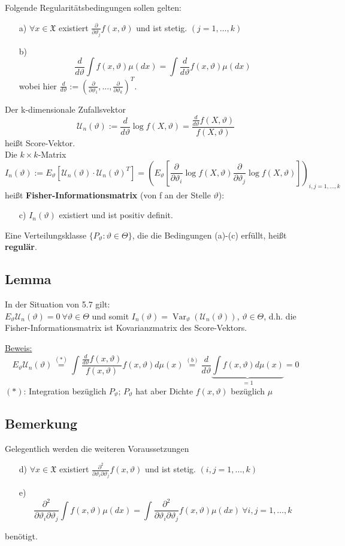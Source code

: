 \documentclass[a4paper,11pt,twoside,titlepage]{article}
\newcommand{\XX}{{\mathfrak X}} %
\newcommand\UU{ \mathcal{U} } %
\DeclareMathOperator{\var}{Var}
\begin{document}
Folgende Regularitätsbedingungen sollen gelten:
\begin{itemize}
\item[a)] $\forall x\in\XX$ existiert $\frac{\partial}{\partial\vartheta_j}f(x,\vartheta)$ und ist stetig. $(j=1,\ldots,k)$
\item[b)] \[\frac{d}{d\vartheta}\int f(x,\vartheta)\mu(dx)=\int\frac{d}{d\vartheta}f(x,\vartheta)\mu(dx)\]
wobei hier $\frac{d}{d\vartheta}:=(\frac{\partial}{\partial\vartheta_1},\ldots,\frac{\partial}{\partial\vartheta_k})^T$.
\end{itemize}

Der k-dimensionale Zufallsvektor
\[\UU_n(\vartheta):=\frac{d}{d\vartheta}\log f(X,\vartheta)=\frac{\frac{d}{d\vartheta}f(X,\vartheta)}{f(X,\vartheta)}\]
heißt Score-Vektor.\\
Die $k\times k$-Matrix
\[I_n(\vartheta):=E_\vartheta[\UU_n(\vartheta)\cdot \UU_n(\vartheta)^T]=\left(E_\vartheta\left[\frac{\partial}{\partial\vartheta_i}\log f(X,\vartheta)\frac{\partial}{\partial\vartheta_j}\log f(X,\vartheta)\right]\right)_{i,j=1,\ldots,k}\]
heißt \textbf{Fisher-Informationsmatrix} (von f an der Stelle $\vartheta$):
\begin{itemize}
\item[c)] $I_n(\vartheta)$ existiert und ist positiv definit.
\end{itemize}

Eine Verteilungsklasse $\{P_\vartheta:\vartheta\in\Theta\}$, die die Bedingungen (a)-(c) erfüllt, heißt \textbf{regulär}.

\subsection{Lemma}
In der Situation von 5.7 gilt:\\
$E_\vartheta \UU_n(\vartheta)=0\ \forall\vartheta\in\Theta$ und somit $I_n(\vartheta)=\var_\vartheta(\UU_n(\vartheta))$, $\vartheta\in\Theta$, d.h. die Fisher-Informationsmatrix ist Kovarianzmatrix des Score-Vektors.

\underline{Beweis:}
\[E_\vartheta\UU_n(\vartheta)\stackrel{(\ast)}{=}\int\frac{\frac{d}{d\vartheta}f(x,\vartheta)}{f(x,\vartheta)}f(x,\vartheta)d\mu(x)\stackrel{(b)}{=}\frac{d}{d\vartheta}\underbrace{\int f(x,\vartheta)d\mu(x)}_{=1}=0\]
$(\ast)$: Integration bezüglich $P_\vartheta$; $P_\vartheta$ hat aber Dichte $f(x,\vartheta)$ bezüglich $\mu$

\subsection{Bemerkung} 
Gelegentlich werden die weiteren Voraussetzungen 
\begin{itemize}
\item[d)] $\forall x\in\XX$ existiert $\frac{\partial^2}{\partial\vartheta_i\partial\vartheta_j}f(x,\vartheta)$ und ist stetig. $(i,j=1,\ldots,k)$
\item[e)] \[\frac{\partial^2}{\partial\vartheta_i\partial\vartheta_j}\int f(x,\vartheta)\mu(dx)=\int\frac{\partial^2}{\partial\vartheta_i\partial\vartheta_j}f(x,\vartheta)\mu(dx)\ \forall i,j=1,\ldots,k\]
\end{itemize}
benötigt.
\end{document}
